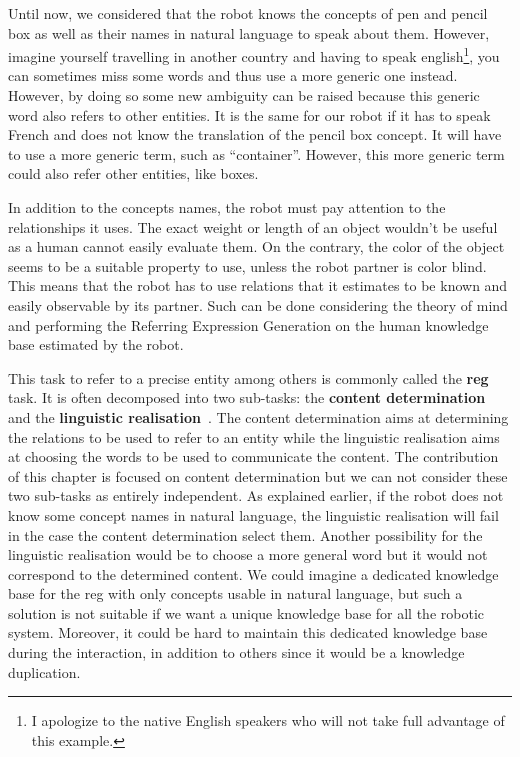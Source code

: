 Until now, we considered that the robot knows the concepts of pen and pencil box as well as their names in natural language to speak about them. However, imagine yourself travelling in another country and having to speak english\footnote{I apologize to the native English speakers who will not take full advantage of this example.}, you can sometimes miss some words and thus use a more generic one instead. However, by doing so some new ambiguity can be raised because this generic word also refers to other entities. It is the same for our robot if it has to speak French and does not know the translation of the pencil box concept. It will have to use a more generic term, such as ``container''. However, this more generic term could also refer other entities, like boxes.

In addition to the concepts names, the robot must pay attention to the relationships it uses. The exact weight or length of an object wouldn't be useful as a human cannot easily evaluate them. On the contrary, the color of the object seems to be a suitable property to use, unless the robot partner is color blind. This means that the robot has to use relations that it estimates to be known and easily observable by its partner. Such can be done considering the theory of mind and performing the Referring Expression Generation on the human knowledge base estimated by the robot.

This task to refer to a precise entity among others is commonly called the \textbf{\acrfull{reg}} task. It is often decomposed into two sub-tasks: the \textbf{content determination} and the \textbf{linguistic realisation}~\cite{krahmer_2012_computational}. The content determination aims at determining the relations to be used to refer to an entity while the linguistic realisation aims at choosing the words to be used to communicate the content. The contribution of this chapter is focused on content determination but we can not consider these two sub-tasks as entirely independent. As explained earlier, if the robot does not know some concept names in natural language, the linguistic realisation will fail in the case the content determination select them. Another possibility for the linguistic realisation would be to choose a more general word but it would not correspond to the determined content. We could imagine a dedicated knowledge base for the \acrshort{reg} with only concepts usable in natural language, but such a solution is not suitable if we want a unique knowledge base for all the robotic system. Moreover, it could be hard to maintain this dedicated knowledge base during the interaction, in addition to others since it would be a knowledge duplication.

